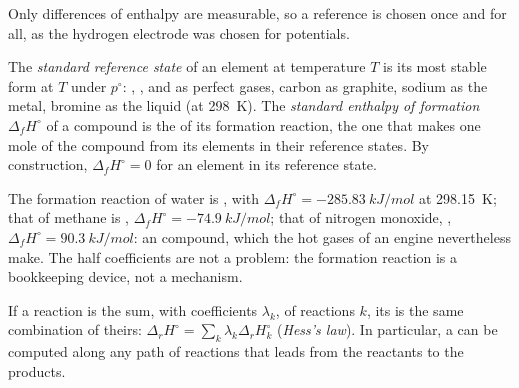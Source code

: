 Only differences of enthalpy are measurable, so a reference is chosen once
and for all, as the hydrogen electrode was chosen for potentials.

\begin{definition}\label{def:b2:reaction-enthalpy:formation}
The \emph{standard reference state} of an
element at temperature $T$ is its most stable form at $T$ under $p^\circ$:
, ,  and  as perfect gases, carbon as
graphite, sodium as the metal, bromine as the liquid (at \qty{298}{K}).
The \emph{standard enthalpy of formation}
$\Delta_f H^\circ$ of a compound is the  of its formation reaction, the one that makes one mole of the
compound from its elements in their reference states. By construction,
$\Delta_f H^\circ = 0$ for an element in its reference state.
\end{definition}

\begin{example}\label{ex:b2:reaction-enthalpy:formation}
The formation reaction of water is , with
$\Delta_f H^\circ = \qty{-285.83}{kJ/mol}$ at \qty{298.15}{K}; that of
methane is , $\Delta_f H^\circ =
\qty{-74.9}{kJ/mol}$; that of nitrogen monoxide, , $\Delta_f H^\circ = \qty{+90.3}{kJ/mol}$: an  compound,
which the hot gases of an engine nevertheless make. The half coefficients
are not a problem: the formation reaction is a bookkeeping device, not a
mechanism.
\end{example}

\begin{theorem}\label{thm:b2:reaction-enthalpy:hess}
If a reaction is the sum, with coefficients $\lambda_k$, of reactions $k$,
its  is the same combination of theirs:
$\Delta_r H^\circ = \sum_k\lambda_k\Delta_r H_k^\circ$
(\emph{Hess's law}). In particular, a 
can be computed along any path of reactions that leads from the
reactants to the products.
\end{theorem}

